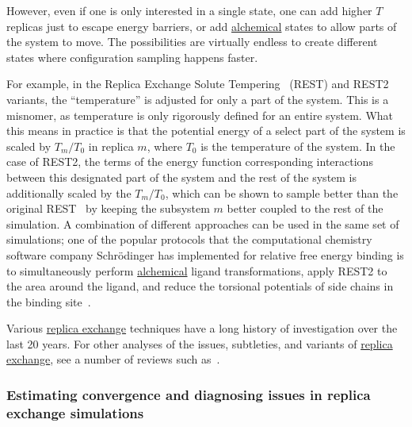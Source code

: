 \documentclass[9pt,review]{livecoms}
\begin{document}
However, even if one is only interested in a single state, one can add higher $T$ replicas just to escape energy barriers, or add \hyperlink{ref:Alchemical} {alchemical} states to allow parts of the system to move. The possibilities are virtually endless to create different states where configuration sampling happens faster.

For example, in the Replica Exchange Solute Tempering~\cite{REST1_Liu_2007} (REST) and REST2~\cite{REST2_Wang_2011} variants, the ``temperature'' is adjusted for only a part of the system. This is a misnomer, as temperature is only rigorously defined for an entire system. What this means in practice is that the potential energy of a select part of the system is scaled by  $T_m/T_0$ in replica $m$, where $T_0$ is the temperature of the system. In the case of REST2, the terms of the energy function corresponding interactions between this designated part of the system and the rest of the system is additionally scaled by the $T_m/T_0$, which can be shown to sample better than the original REST~\citep{REST2_Wang_2011} by keeping the subsystem $m$ better coupled to the rest of the simulation. A combination of different approaches can be used in the same set of simulations; one of the popular protocols that the computational chemistry software company Schr\"{o}dinger has implemented for relative free energy binding is to simultaneously perform \hyperlink{ref:Alchemical} {alchemical} ligand transformations, apply REST2 to the area around the ligand, and reduce the torsional potentials of side chains in the binding site~\cite{Wang:JCTC:2013}.


Various \hyperlink{ref:ReplEx} {replica exchange} techniques have a long history of investigation over the last 20 years. For other analyses of the issues, subtleties, and variants of \hyperlink{ref:ReplEx} {replica exchange}, see a number of reviews such as~\cite{Abrams:E:2014,Gallicchio:CPC:2015,Itoh:JCTC:2013,kofke:2002:jcp:acceptance-probability,Liu:CPL:2018,nadler-hansmann:pre:2007:optimized-replica-exchange-moves,Qi:PSMaP:2018,shenfeld-xu:pre:2009:thermodynamic-length,sindhikara-emerson-roitberg:jctc:2010:exchange-often-and-properly}.

\subsubsection{Estimating convergence and diagnosing issues in replica exchange simulations}
\end{document}
